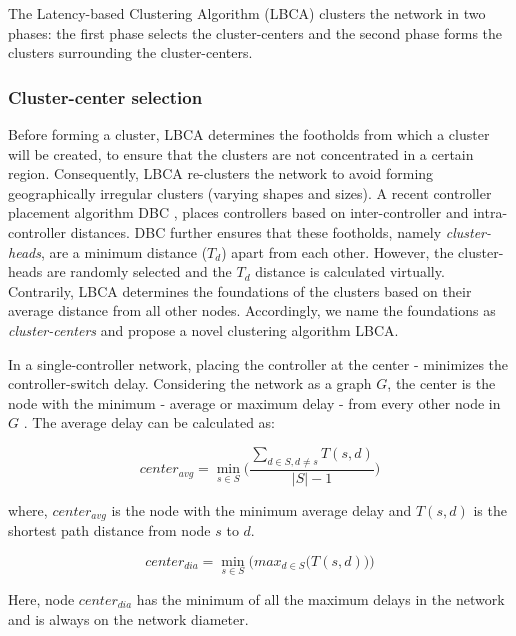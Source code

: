 \documentclass[a4paper,fleqn]{cas-dc}
\begin{document}
\noindent The Latency-based Clustering Algorithm (LBCA) clusters the network in two phases: the first phase selects the cluster-centers and the second phase forms the clusters surrounding the cluster-centers.

\subsubsection{Cluster-center selection}

\noindent Before forming a cluster, LBCA determines the footholds from which a cluster will be created, to ensure that the clusters are not concentrated in a certain region. Consequently, LBCA re-clusters the network to avoid forming geographically irregular clusters (varying shapes and sizes). A recent controller placement algorithm DBC \cite{aziz2019degree}, places controllers based on inter-controller and intra-controller distances. DBC further ensures that these footholds, namely \textit{cluster-heads}, are a minimum distance ($T_d$) apart from each other. However, the cluster-heads are randomly selected and the $T_d$ distance is calculated virtually. Contrarily, LBCA determines the foundations of the clusters based on their average distance from all other nodes. Accordingly, we name the foundations as \textit{cluster-centers} and propose a novel clustering algorithm LBCA.

In a single-controller network, placing the controller at the center - minimizes the controller-switch delay. Considering the network as a graph $G$, the center is the node with the minimum - average or maximum delay - from every other node in $G$ \cite{wilson1979introduction}. The average delay can be calculated as:

\begin{equation} \label{eqn:avgDis}
center_{avg} = \min_{s\in S}\bigg(\frac{\sum_{d\in S, d\ne s}T(s,d)}{|S|-1}\bigg)
\end{equation}

where, $center_{avg}$ is the node with the minimum average delay and $T(s,d)$ is the shortest path distance from node $s$ to $d$.

\begin{equation} \label{eqn:maxDis}
center_{dia} = \min_{s\in S}\bigg(max_{d\in S}\big(T(s,d)\big)\bigg)
\end{equation}

Here, node $center_{dia}$ has the minimum of all the maximum delays in the network and is always on the network diameter.
\end{document}
